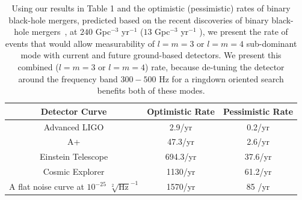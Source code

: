 \begin{table}[hbp!]
\centering
\begin{tabular}{||c c c ||} 
 \hline
 Detector Curve & Optimistic Rate & Pessimistic Rate \\ [0.5ex] 
 \hline\hline
 Advanced LIGO & 2.9/yr & 0.2/yr \\ 
 A+ & 47.3/yr & 2.6/yr \\
 Einstein Telescope & 694.3/yr & 37.6/yr \\
 Cosmic Explorer & 1130/yr & 61.2/yr \\
 A flat noise curve at $10^{-25}$ $\sqrt[2]{\mathrm{Hz}}^{-1}$ & 1570/yr & 85 /yr \\ [1ex] 
 \hline
\end{tabular}
\caption {Using our results in Table 1 and the optimistic (pessimistic) rates of binary black-hole mergers, predicted based on the recent discoveries of binary black-hole mergers~\cite{LIGO:2016Rates}, at $240$ Gpc$^{-3}$ yr$^{-1}$ ($13$ Gpc$^{-3}$ yr$^{-1}$ ), we present the rate of events that would allow measurability of $l=m=3$ or $l=m=4$ sub-dominant mode with current and future ground-based detectors. We present this combined ($l=m=3$ or $l=m=4$) rate, because de-tuning the detector around the frequency band $300-500$ Hz for a ringdown oriented search benefits both of these modes. }
\label{table:2}
\end{table}






